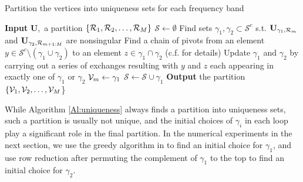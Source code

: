 \documentclass[journal, 10pt]{IEEEtran}
\begin{document}
\begin{algorithm} 
\caption{Partition the vertices into uniqueness sets for each frequency band}
\begin{algorithmic}
\State \textbf{Input} $\mathbf{U}$,~a partition $\{{{\cal R}_1,{\cal R}_2,\ldots,{\cal R}_M}\}$ %
\State $\mathcal{S} \gets \emptyset$
\State Find sets $\gamma_1, \gamma_2 \subset {\mathcal{S}}^c$ s.t. $\mathbf{U}_{\gamma_1,{\cal R}_m}$ and $\mathbf{U}_{\gamma_2,{\cal R}_{m+1:M}}$ are nonsingular
\While {$\gamma_1 \cap \gamma_2 \neq \emptyset$}
\State Find a chain of pivots from an element $y \in {\mathcal S}^c \setminus (\gamma_1 \cup \gamma_2)$
to an element $z \in \gamma_1 \cap \gamma_2$ (c.f. \cite{greene_magnanti} for details)
\State Update $\gamma_1$ and $\gamma_2$ by carrying out a series of exchanges resulting with $y$ and $z$ each appearing in exactly one of $\gamma_1$ or $\gamma_2$
\EndWhile
\State ${\mathcal{V}}_m \gets \gamma_1$%
\State $\mathcal{S} \gets \mathcal{S} \cup \gamma_1$ %
\EndFor
\State \textbf{Output} the partition $\{{\mathcal{V}}_1,{\mathcal{V}}_2,\ldots,{\mathcal{V}}_M$\}
\end{algorithmic}
\label{Al:uniqueness}
\end{algorithm}

\begin{remark}
While Algorithm \ref{Al:uniqueness} always finds a partition into uniqueness sets, such a partition is usually not unique, and the initial choices of $\gamma_i$ in each loop play a significant role in the final 
partition. In the numerical experiments in the next section, we use the greedy algorithm in \cite[Algorithm 1]{shomorony} to find an initial choice for $\gamma_1$, and use row reduction after permuting the complement of $\gamma_1$ to the top to find an initial choice for $\gamma_2$.  %
\end{remark}
\end{document}
